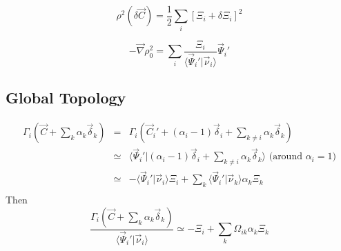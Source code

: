 \documentclass[aps,12pt]{revtex4}
\begin{document}
\begin{equation}
	\rho^2(\delta\vec{C}) = \dfrac{1}{2} \sum_i \left[ \Xi_i + \delta\Xi_i \right]^2
\end{equation} 

\begin{equation}
	- \vec{\nabla} \rho^2_0 = \sum_i \dfrac{\Xi_i}{\langle \vec{\Psi}_i' \vert \vec{\nu}_i \rangle} \vec{\Psi}_i'
\end{equation}


\subsection{Global Topology}

\begin{equation}
\begin{array}{rcl}
	\Gamma_i \left(\vec{C} + \sum_k \alpha_k \vec{\delta}_k \right) & = & 
	\Gamma_i \left(\vec{C}_i' + (\alpha_i-1) \vec{\delta}_i + \sum_{k\not=i} \alpha_k \vec{\delta}_k \right)\\
	& \simeq & \langle \vec{\Psi}_i' \vert (\alpha_i-1) \vec{\delta}_i + \sum_{k\not=i} \alpha_k \vec{\delta}_k \rangle \text{ (around $\alpha_i=1$)}\\
	& \simeq & -\langle \vec{\Psi}_i'\vert \vec{\nu}_i \rangle \Xi_i + \sum_k \langle \vec{\Psi}_i'\vert \vec{\nu}_k \rangle \alpha_k \Xi_k \\
\end{array}
\end{equation}
Then
\begin{equation}
	\dfrac{\Gamma_i\left(\vec{C} + \sum_k \alpha_k \vec{\delta}_k \right)}{\langle \vec{\Psi}_i'\vert \vec{\nu}_i \rangle} \simeq
	-\Xi_i + \sum_k \Omega_{ik} \alpha_k \Xi_k
\end{equation}
\end{document}
